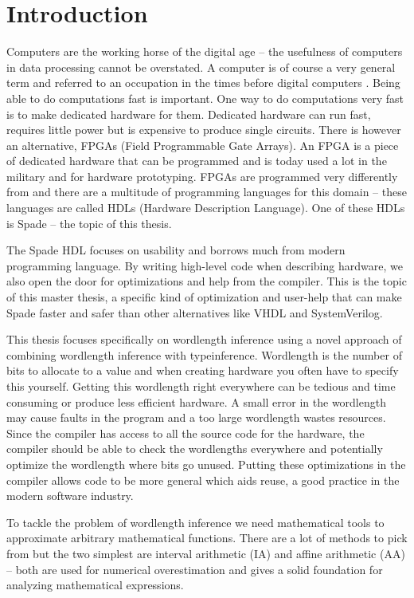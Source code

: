 \chapter{Introduction}
\label{chaIntro}
Computers are the working horse of the digital age -- the usefulness of computers in data processing cannot be overstated. A computer is of course a very general term and referred to an occupation in the times before digital computers \cite{src:ComputerOccupation}. Being able to do computations fast is important. One way to do computations very fast is to make dedicated hardware for them. Dedicated hardware can run fast, requires little power but is expensive to produce single circuits. There is however an alternative, FPGAs (Field Programmable Gate Arrays). An FPGA is a piece of dedicated hardware that can be programmed and is today used a lot in the military and for hardware prototyping. FPGAs are programmed very differently from  and there are a multitude of programming languages for this domain -- these languages are called HDLs (Hardware Description Language). One of these HDLs is Spade -- the topic of this thesis.

The Spade HDL focuses on usability and borrows much from modern programming language\cite{src:spadeSomething, src:spadeAnHDL}. By writing high-level code when describing hardware, we also open the door for optimizations and help from the compiler. This is the topic of this master thesis, a specific kind of optimization and user-help that can make Spade faster and safer than other alternatives like VHDL and SystemVerilog.

This thesis focuses specifically on wordlength inference using a novel approach of combining wordlength inference with typeinference. Wordlength is the number of bits to allocate to a value and when creating hardware you often have to specify this yourself. Getting this wordlength right everywhere can be tedious and time consuming or produce less efficient hardware. A small error in the wordlength may cause faults in the program and a too large wordlength wastes resources.
Since the compiler has access to all the source code for the hardware, the compiler should be able to check the wordlengths everywhere and potentially optimize the wordlength where bits go unused. Putting these optimizations in the compiler allows code to be more general which aids reuse, a good practice in the modern software industry. 

To tackle the problem of wordlength inference we need mathematical tools to approximate arbitrary mathematical functions. There are a lot of methods to pick from but the two simplest are interval arithmetic (IA)\cite{src:affAri} and affine arithmetic (AA)\cite{src:affAri} -- both are used for numerical overestimation and gives a solid foundation for analyzing mathematical expressions.

